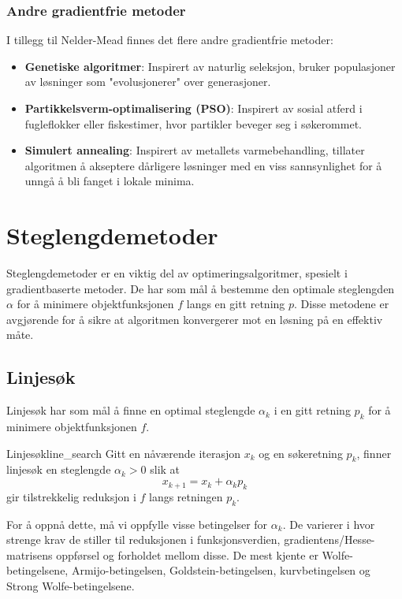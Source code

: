 \subsection{Andre gradientfrie metoder}

I tillegg til Nelder-Mead finnes det flere andre gradientfrie metoder:

\begin{itemize}
    \item \textbf{Genetiske algoritmer}: Inspirert av naturlig seleksjon, bruker populasjoner av løsninger som "evolusjonerer" over generasjoner.
    \item \textbf{Partikkelsverm-optimalisering (PSO)}: Inspirert av sosial atferd i fugleflokker eller fiskestimer, hvor partikler beveger seg i søkerommet.
    \item \textbf{Simulert annealing}: Inspirert av metallets varmebehandling, tillater algoritmen å akseptere dårligere løsninger med en viss sannsynlighet for å unngå å bli fanget i lokale minima.
\end{itemize}

\chapter{Steglengdemetoder}
\label{chap:step_length_methods}
Steglengdemetoder er en viktig del av optimeringsalgoritmer, spesielt i gradientbaserte metoder.
De har som mål å bestemme den optimale steglengden \(\alpha\) for å minimere objektfunksjonen \(f\) langs en gitt retning \(p\).
Disse metodene er avgjørende for å sikre at algoritmen konvergerer mot en løsning på en effektiv måte.

\section{Linjesøk}\label{sec:line_search}
Linjesøk har som mål å finne en optimal steglengde \(\alpha_k\) i en gitt retning \(p_k\) for å minimere objektfunksjonen \(f\).

\begin{definition}{Linjesøk}{line_search}
	Gitt en nåværende iterasjon \(x_k\) og en søkeretning \(p_k\), finner linjesøk en steglengde \(\alpha_k > 0\) slik at
	\[
		x_{k+1} = x_k + \alpha_k p_k
	\]
	gir tilstrekkelig reduksjon i \(f\) langs retningen \(p_k\).
\end{definition}

For å oppnå dette, må vi oppfylle visse betingelser for \(\alpha_k\).
De varierer i hvor strenge krav de stiller til reduksjonen i funksjonsverdien, gradientens/Hesse-matrisens oppførsel og forholdet mellom disse.
De mest kjente er Wolfe-betingelsene, Armijo-betingelsen, Goldstein-betingelsen, kurvbetingelsen og Strong Wolfe-betingelsene.

